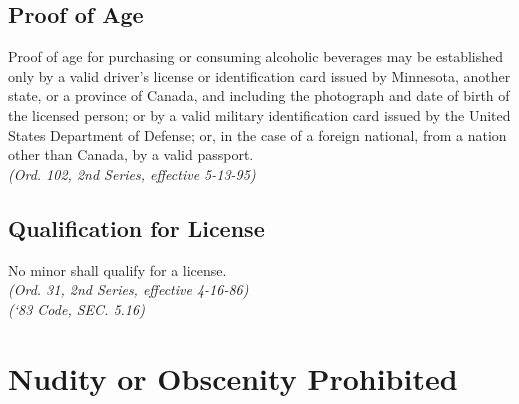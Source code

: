 \subsection{Proof of Age}
Proof of age for purchasing or consuming alcoholic beverages may be established only by a valid driver’s license or identification card issued by Minnesota, another state, or a province of Canada, and including the photograph and date of birth of the licensed person; or by a valid military identification card issued by the United States Department of Defense; or, in the case of a foreign national, from a nation other than Canada, by a valid passport.\\
\emph{(Ord. 102, 2nd Series, effective 5-13-95)}
\subsection{Qualification for License}
No minor shall qualify for a license.\\
\emph{(Ord. 31, 2nd Series, effective 4-16-86)}\\
\emph{(‘83 Code, SEC. 5.16)}
\section{Nudity or Obscenity Prohibited}
